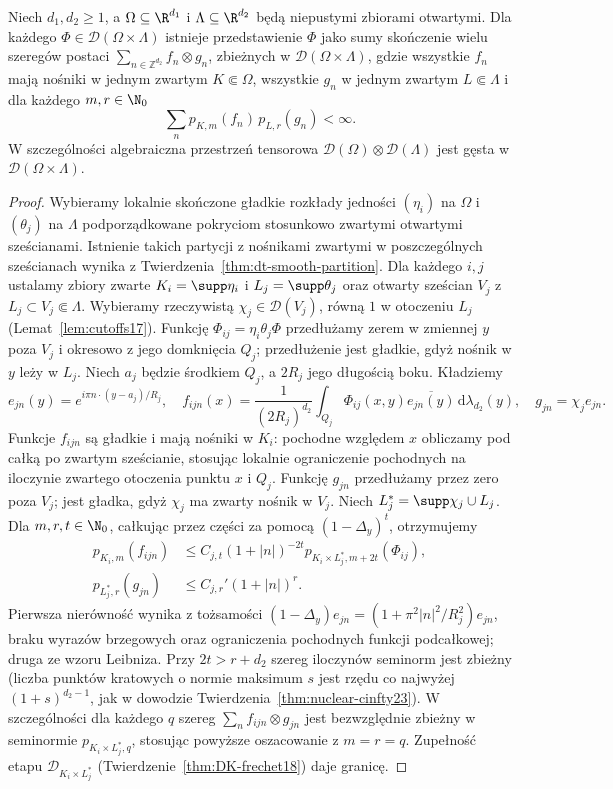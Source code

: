 \begin{lemat}
\label{lem:tensor-density23}
Niech $d_1,d_2\ge1$, a $\Omega\subseteq\R^{d_1}$ i
$\Lambda\subseteq\R^{d_2}$ będą niepustymi zbiorami otwartymi.
Dla każdego $\Phi\in\mathcal D(\Omega\times\Lambda)$
istnieje przedstawienie $\Phi$ jako sumy skończenie
wielu szeregów postaci
$\sum_{n\in\mathbb Z^{d_2}}f_n\otimes g_n$,
zbieżnych w $\mathcal D(\Omega\times\Lambda)$,
gdzie wszystkie $f_n$ mają nośniki w jednym zwartym
$K\Subset\Omega$, wszystkie $g_n$ w jednym zwartym
$L\Subset\Lambda$ i dla każdego $m,r\in\N_0$
\[
 \sum_n p_{K,m}(f_n)\,p_{L,r}(g_n)<\infty.
\]
W szczególności algebraiczna przestrzeń tensorowa
$\mathcal D(\Omega)\otimes\mathcal D(\Lambda)$
jest gęsta w $\mathcal D(\Omega\times\Lambda)$.
\end{lemat}
\begin{proof}
Wybieramy lokalnie skończone gładkie rozkłady jedności
$(\eta_i)$ na $\Omega$ i $(\theta_j)$ na $\Lambda$
podporządkowane pokryciom stosunkowo zwartymi otwartymi
sześcianami. Istnienie takich partycji z nośnikami
zwartymi w poszczególnych sześcianach wynika z
Twierdzenia~\ref{thm:dt-smooth-partition}.
Dla każdego $i,j$ ustalamy zbiory zwarte
$K_i=\supp\eta_i$ i $L_j=\supp\theta_j$ oraz otwarty
sześcian $V_j$ z $L_j\subset V_j\Subset\Lambda$.
Wybieramy rzeczywistą $\chi_j\in\mathcal D(V_j)$,
równą $1$ w otoczeniu $L_j$ (Lemat~\ref{lem:cutoffs17}).
Funkcję $\Phi_{ij}=\eta_i\theta_j\Phi$ przedłużamy
zerem w zmiennej $y$ poza $V_j$ i okresowo z jego
domknięcia $Q_j$; przedłużenie jest gładkie,
gdyż nośnik w $y$ leży w $L_j$.
Niech $a_j$ będzie środkiem $Q_j$, a $2R_j$ jego
długością boku. Kładziemy
\[
 e_{jn}(y)=e^{i\pi n\cdot(y-a_j)/R_j},
 \quad
 f_{ijn}(x)=\frac{1}{(2R_j)^{d_2}}
 \int_{Q_j}\Phi_{ij}(x,y)\overline{e_{jn}(y)}
 \,\mathrm d\lambda_{d_2}(y),
 \quad g_{jn}=\chi_j e_{jn}.
\]
Funkcje $f_{ijn}$ są gładkie i mają nośniki w $K_i$:
pochodne względem $x$ obliczamy pod całką po zwartym
sześcianie, stosując lokalnie ograniczenie pochodnych
na iloczynie zwartego otoczenia punktu $x$ i $Q_j$.
Funkcję $g_{jn}$ przedłużamy przez zero poza $V_j$;
jest gładka, gdyż $\chi_j$ ma zwarty nośnik w $V_j$.
Niech $L_j^*=\supp\chi_j\cup L_j$.
Dla $m,r,t\in\N_0$, całkując przez części za pomocą
$(1-\Delta_y)^t$, otrzymujemy
\[
 \begin{aligned}
 p_{K_i,m}(f_{ijn})&\le C_{j,t}
 (1+|n|)^{-2t}p_{K_i\times L_j^*,m+2t}(\Phi_{ij}),\\
 p_{L_j^*,r}(g_{jn})&\le C_{j,r}'(1+|n|)^r .
 \end{aligned}
\]
Pierwsza nierówność wynika z tożsamości
$(1-\Delta_y)e_{jn}=(1+\pi^2|n|^2/R_j^2)e_{jn}$,
braku wyrazów brzegowych oraz ograniczenia pochodnych
funkcji podcałkowej; druga ze wzoru Leibniza.
Przy $2t>r+d_2$ szereg iloczynów seminorm jest zbieżny
(liczba punktów kratowych o normie maksimum $s$
jest rzędu co najwyżej $(1+s)^{d_2-1}$, jak w
dowodzie Twierdzenia~\ref{thm:nuclear-cinfty23}).
W szczególności dla każdego $q$ szereg
$\sum_n f_{ijn}\otimes g_{jn}$ jest bezwzględnie
zbieżny w seminormie $p_{K_i\times L_j^*,q}$,
stosując powyższe oszacowanie z $m=r=q$.
Zupełność etapu $\mathcal D_{K_i\times L_j^*}$
(Twierdzenie~\ref{thm:DK-frechet18}) daje granicę.


\end{proof}
